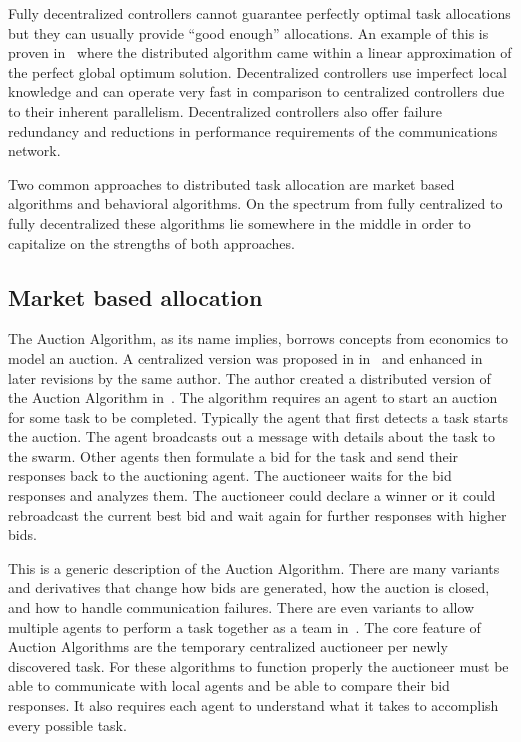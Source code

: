 Fully decentralized controllers cannot guarantee perfectly optimal task allocations but they can usually provide ``good enough'' allocations.  An example of this is proven in~\citet{auction_linear_approx} where the distributed algorithm came within a linear approximation of the perfect global optimum solution.  Decentralized controllers use imperfect local knowledge and can operate very fast in comparison to centralized controllers due to their inherent parallelism.  Decentralized controllers also offer failure redundancy and reductions in performance requirements of the communications network.

Two common approaches to distributed task allocation are market based algorithms and behavioral algorithms.  On the spectrum from fully centralized to fully decentralized these algorithms lie somewhere in the middle in order to capitalize on the strengths of both approaches.

\subsection{Market based allocation}

The Auction Algorithm, as its name implies, borrows concepts from economics to model an auction.  A centralized version was proposed in in~\citet{auction_derive} and enhanced in later revisions by the same author.  The author created a distributed version of the Auction Algorithm in~\citet{auction_parallel}.  The algorithm requires an agent to start an auction for some task to be completed.  Typically the agent that first detects a task starts the auction.  The agent broadcasts out a message with details about the task to the swarm.  Other agents then formulate a bid for the task and send their responses back to the auctioning agent.  The auctioneer waits for the bid responses and analyzes them.  The auctioneer could declare a winner or it could rebroadcast the current best bid and wait again for further responses with higher bids.  

This is a generic description of the Auction Algorithm.  There are many variants and derivatives that change how bids are generated, how the auction is closed, and how to handle communication failures.  There are even variants to allow multiple agents to perform a task together as a team in~\citet{auction_team}.  The core feature of Auction Algorithms are the temporary centralized auctioneer per newly discovered task.  For these algorithms to function properly the auctioneer must be able to communicate with local agents and be able to compare their bid responses.  It also requires each agent to understand what it takes to accomplish every possible task.

